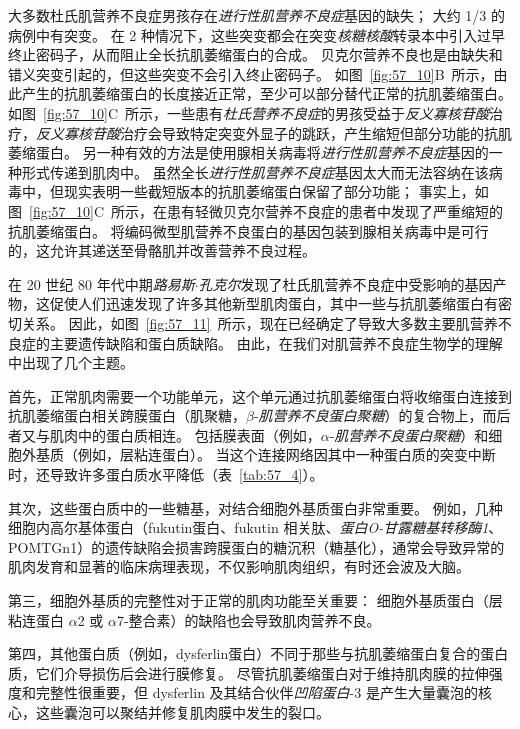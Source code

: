 大多数杜氏肌营养不良症男孩存在\textit{进行性肌营养不良症}基因的缺失；
大约 1/3 的病例中有突变。
在 2 种情况下，这些突变都会在突变\textit{核糖核酸}转录本中引入过早终止密码子，从而阻止全长抗肌萎缩蛋白的合成。
贝克尔营养不良也是由缺失和错义突变引起的，但这些突变不会引入终止密码子。
如图~\ref{fig:57_10}B~所示，由此产生的抗肌萎缩蛋白的长度接近正常，至少可以部分替代正常的抗肌萎缩蛋白。
如图~\ref{fig:57_10}C~所示，一些患有\textit{杜氏营养不良症}的男孩受益于\textit{反义寡核苷酸}治疗，\textit{反义寡核苷酸}治疗会导致特定突变外显子的跳跃，产生缩短但部分功能的抗肌萎缩蛋白。
另一种有效的方法是使用腺相关病毒将\textit{进行性肌营养不良症}基因的一种形式传递到肌肉中。
虽然全长\textit{进行性肌营养不良症}基因太大而无法容纳在该病毒中，但现实表明一些截短版本的抗肌萎缩蛋白保留了部分功能；
事实上，如图~\ref{fig:57_10}C~所示，在患有轻微贝克尔营养不良症的患者中发现了严重缩短的抗肌萎缩蛋白。
将编码微型肌营养不良蛋白的基因包装到腺相关病毒中是可行的，这允许其递送至骨骼肌并改善营养不良过程。


在 20 世纪 80 年代中期\textit{路易斯$\cdot$孔克尔}发现了杜氏肌营养不良症中受影响的基因产物，这促使人们迅速发现了许多其他新型肌肉蛋白，其中一些与抗肌萎缩蛋白有密切关系。
因此，如图~\ref{fig:57_11}~所示，现在已经确定了导致大多数主要肌营养不良症的主要遗传缺陷和蛋白质缺陷。
由此，在我们对肌营养不良症生物学的理解中出现了几个主题。


首先，正常肌肉需要一个功能单元，这个单元通过抗肌萎缩蛋白将收缩蛋白连接到抗肌萎缩蛋白相关跨膜蛋白（肌聚糖，$\beta $-\textit{肌营养不良蛋白聚糖}）的复合物上，而后者又与肌肉中的蛋白质相连。
包括膜表面（例如，$\alpha$-\textit{肌营养不良蛋白聚糖}）和细胞外基质（例如，层粘连蛋白）。
当这个连接网络因其中一种蛋白质的突变中断时，还导致许多蛋白质水平降低（表~\ref{tab:57_4}）。


其次，这些蛋白质中的一些糖基，对结合细胞外基质蛋白非常重要。
例如，几种细胞内高尔基体蛋白（fukutin蛋白、fukutin 相关肽、\textit{蛋白O-甘露糖基转移酶1}、POMTGn1）的遗传缺陷会损害跨膜蛋白的糖沉积（糖基化），通常会导致异常的肌肉发育和显著的临床病理表现，不仅影响肌肉组织，有时还会波及大脑。


第三，细胞外基质的完整性对于正常的肌肉功能至关重要：
细胞外基质蛋白（层粘连蛋白 $\alpha$2 或 $\alpha$7-整合素）的缺陷也会导致肌肉营养不良。


第四，其他蛋白质（例如，dysferlin蛋白）不同于那些与抗肌萎缩蛋白复合的蛋白质，它们介导损伤后会进行膜修复。
尽管抗肌萎缩蛋白对于维持肌肉膜的拉伸强度和完整性很重要，但 dysferlin 及其结合伙伴\textit{凹陷蛋白}-3 是产生大量囊泡的核心，这些囊泡可以聚结并修复肌肉膜中发生的裂口。



